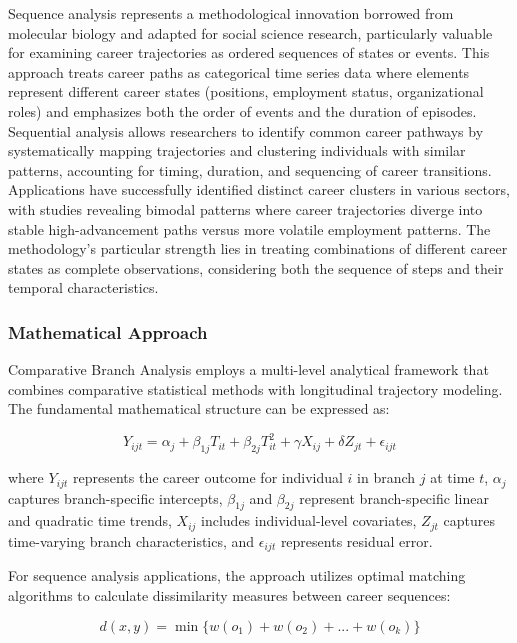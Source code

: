 \documentclass[main.tex]{subfiles}
\begin{document}
Sequence analysis represents a methodological innovation borrowed from molecular biology and adapted for social science research, particularly valuable for examining career trajectories as ordered sequences of states or events\parencite{ECB2021, PoliticalMethodology2018, Jones2001, TraMineR2024}. This approach treats career paths as categorical time series data where elements represent different career states (positions, employment status, organizational roles) and emphasizes both the order of events and the duration of episodes. Sequential analysis allows researchers to identify common career pathways by systematically mapping trajectories and clustering individuals with similar patterns, accounting for timing, duration, and sequencing of career transitions. Applications have successfully identified distinct career clusters in various sectors, with studies revealing bimodal patterns where career trajectories diverge into stable high-advancement paths versus more volatile employment patterns. The methodology's particular strength lies in treating combinations of different career states as complete observations, considering both the sequence of steps and their temporal characteristics.

\subsubsection{Mathematical Approach}

Comparative Branch Analysis employs a multi-level analytical framework that combines comparative statistical methods with longitudinal trajectory modeling. The fundamental mathematical structure can be expressed as:

\[
Y_{ijt} = \alpha_j + \beta_{1j}T_{it} + \beta_{2j}T_{it}^2 + \gamma X_{ij} + \delta Z_{jt} + \epsilon_{ijt}
\]

where \(Y_{ijt}\) represents the career outcome for individual \(i\) in branch \(j\) at time \(t\), \(\alpha_j\) captures branch-specific intercepts, \(\beta_{1j}\) and \(\beta_{2j}\) represent branch-specific linear and quadratic time trends, \(X_{ij}\) includes individual-level covariates, \(Z_{jt}\) captures time-varying branch characteristics, and \(\epsilon_{ijt}\) represents residual error\parencite{Jones2001, CognitiveNeuro2021}.

For sequence analysis applications, the approach utilizes optimal matching algorithms to calculate dissimilarity measures between career sequences:

\[
d(x,y) = \min\{w(o_1) + w(o_2) + ... + w(o_k)\}
\]
\end{document}
